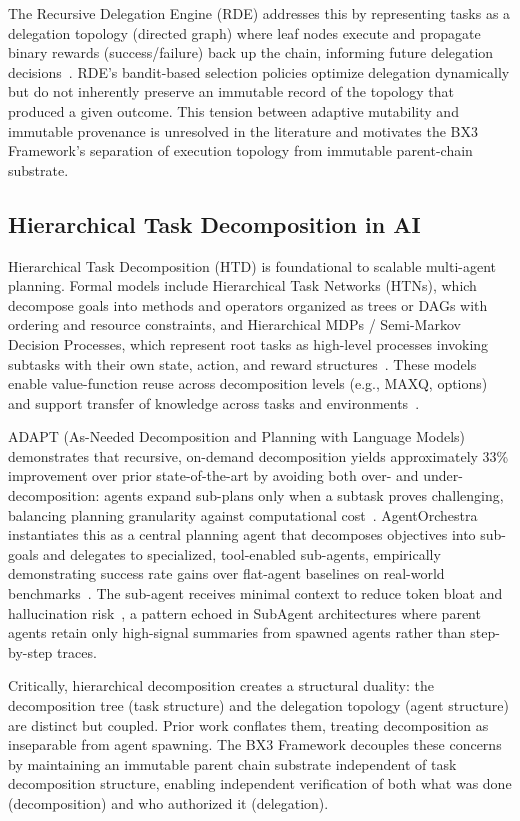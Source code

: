 The Recursive Delegation Engine (RDE) addresses this by representing tasks as a delegation topology (directed graph) where leaf nodes execute and propagate binary rewards (success/failure) back up the chain, informing future delegation decisions~\cite{rde}. RDE's bandit-based selection policies optimize delegation dynamically but do not inherently preserve an immutable record of the topology that produced a given outcome. This tension between adaptive mutability and immutable provenance is unresolved in the literature and motivates the BX3 Framework's separation of execution topology from immutable parent-chain substrate.

\subsection{Hierarchical Task Decomposition in AI}

Hierarchical Task Decomposition (HTD) is foundational to scalable multi-agent planning. Formal models include Hierarchical Task Networks (HTNs), which decompose goals into methods and operators organized as trees or DAGs with ordering and resource constraints, and Hierarchical MDPs / Semi-Markov Decision Processes, which represent root tasks as high-level processes invoking subtasks with their own state, action, and reward structures~\cite{htd-survey}. These models enable value-function reuse across decomposition levels (e.g., MAXQ, options) and support transfer of knowledge across tasks and environments~\cite{htd-survey}.

ADAPT (As-Needed Decomposition and Planning with Language Models) demonstrates that recursive, on-demand decomposition yields approximately 33\% improvement over prior state-of-the-art by avoiding both over- and under-decomposition: agents expand sub-plans only when a subtask proves challenging, balancing planning granularity against computational cost~\cite{adapt}. AgentOrchestra instantiates this as a central planning agent that decomposes objectives into sub-goals and delegates to specialized, tool-enabled sub-agents, empirically demonstrating success rate gains over flat-agent baselines on real-world benchmarks~\cite{agentorchestra}. The sub-agent receives minimal context to reduce token bloat and hallucination risk~\cite{agentorchestra}, a pattern echoed in SubAgent architectures where parent agents retain only high-signal summaries from spawned agents rather than step-by-step traces.

Critically, hierarchical decomposition creates a structural duality: the decomposition tree (task structure) and the delegation topology (agent structure) are distinct but coupled. Prior work conflates them, treating decomposition as inseparable from agent spawning. The BX3 Framework decouples these concerns by maintaining an immutable parent chain substrate independent of task decomposition structure, enabling independent verification of both what was done (decomposition) and who authorized it (delegation).

